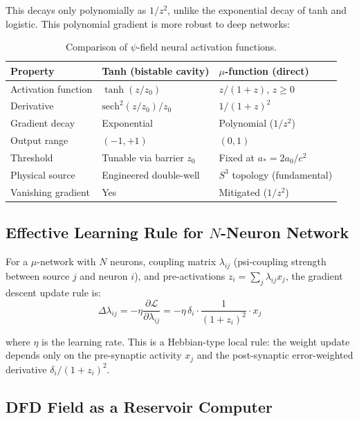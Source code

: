 \documentclass[11pt]{article}
\theoremstyle{definition}
\theoremstyle{remark}
\begin{document}
This decays only polynomially as $1/z^2$, unlike the exponential decay
of tanh and logistic. This polynomial gradient is more robust to deep
networks:

\begin{table}[h]
\centering
\caption{Comparison of $\psi$-field neural activation functions.}
\label{tab:activation_comparison}
\begin{tabular}{@{}lll@{}}
\toprule
Property & Tanh (bistable cavity) & $\mu$-function (direct) \\
\midrule
Activation function & $\tanh(z/z_0)$ & $z/(1+z)$, $z\geq 0$ \\
Derivative & $\mathrm{sech}^2(z/z_0)/z_0$ & $1/(1+z)^2$ \\
Gradient decay & Exponential & Polynomial ($1/z^2$) \\
Output range & $(-1,+1)$ & $(0,1)$ \\
Threshold & Tunable via barrier $z_0$ & Fixed at $a_* = 2a_0/c^2$ \\
Physical source & Engineered double-well & $S^3$ topology (fundamental) \\
Vanishing gradient & Yes & Mitigated ($1/z^2$) \\
\bottomrule
\end{tabular}
\end{table}

\subsection{Effective Learning Rule for $N$-Neuron Network}
\label{sec:learning_rule}

For a $\mu$-network with $N$ neurons, coupling matrix $\lambda_{ij}$
(psi-coupling strength between source $j$ and neuron $i$), and
pre-activations $z_i = \sum_j \lambda_{ij} x_j$, the gradient descent
update rule is:
\begin{equation}
\Delta\lambda_{ij} = -\eta \frac{\partial\mathcal{L}}{\partial\lambda_{ij}}
= -\eta\,\delta_i \cdot \frac{1}{(1+z_i)^2} \cdot x_j
\label{eq:weight_update}
\end{equation}

where $\eta$ is the learning rate. This is a Hebbian-type local rule:
the weight update depends only on the pre-synaptic activity $x_j$ and
the post-synaptic error-weighted derivative $\delta_i/(1+z_i)^2$.

\subsection{DFD Field as a Reservoir Computer}
\label{sec:reservoir}
\end{document}
